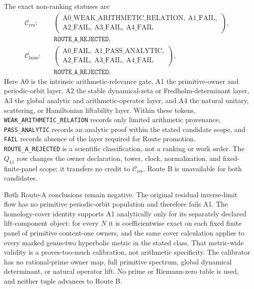 \documentclass[11pt]{article}
\theoremstyle{definition}
\theoremstyle{remark}
\begin{document}
The exact non-ranking statuses are
\[
\begin{aligned}
\mathcal C_{\mathrm{res}}:\quad&
\left(
\begin{gathered}
\mathrm{A0\_WEAK\_ARITHMETIC\_RELATION},\ \mathrm{A1\_FAIL},\\
\mathrm{A2\_FAIL},\ \mathrm{A3\_FAIL},\ \mathrm{A4\_FAIL}
\end{gathered}
\right),\\[-1pt]
&\texttt{ROUTE\_A\_REJECTED},\\[4pt]
\mathcal C_{\mathrm{hom}}:\quad&
\left(
\begin{gathered}
\mathrm{A0\_FAIL},\ \mathrm{A1\_PASS\_ANALYTIC},\\
\mathrm{A2\_FAIL},\ \mathrm{A3\_FAIL},\ \mathrm{A4\_FAIL}
\end{gathered}
\right),\\[-1pt]
&\texttt{ROUTE\_A\_REJECTED}.
\end{aligned}
\]
Here A0 is the intrinsic arithmetic-relevance gate, A1 the primitive-owner and periodic-orbit layer, A2 the stable dynamical-zeta or Fredholm-determinant layer, A3 the global analytic and arithmetic-operator layer, and A4 the natural unitary, scattering, or Hamiltonian liftability layer. Within these tokens, \texttt{WEAK\_ARITHMETIC\_RELATION} records only limited arithmetic provenance, \texttt{PASS\_ANALYTIC} records an analytic proof within the stated candidate scope, and \texttt{FAIL} records absence of the layer required for Route promotion. \texttt{ROUTE\_A\_REJECTED} is a scientific classification, not a ranking or work order. The $Q_{11}$ row changes the owner declaration, tower, clock, normalization, and fixed-finite-panel scope; it transfers no credit to $\mathcal C_{\mathrm{res}}$. Route B is unavailable for both candidates.

Both Route-A conclusions remain negative. The original residual inverse-limit flow has no primitive periodic-orbit population and therefore fails A1. The homology-cover identity supports A1 analytically only for its separately declared lift-component object: for every $N$ it is coefficientwise exact on each fixed finite panel of primitive content-one owners, and the same cover calculation applies to every marked genus-two hyperbolic metric in the stated class. That metric-wide validity is a proves-too-much calibration, not arithmetic specificity. The calibrator has no rational-prime owner map, full primitive spectrum, global dynamical determinant, or natural operator lift. No prime or Riemann-zero table is used, and neither tuple advances to Route B.
\end{document}
